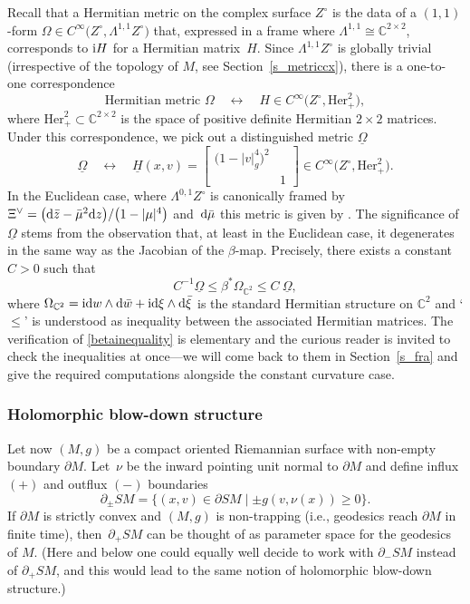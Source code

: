 \documentclass[pdftex]{sigma}
\numberwithin{equation}{section}
\theoremstyle{definition}
\newcommand{\C}{\mathbb{C}} %
\newcommand{\1}{{\bf 1}}
\newcommand{\Om}{{\underline{\Omega}}}
\begin{document}
Recall that a Hermitian metric on the complex surface $Z^\circ$ is the data of a $(1,1)$-form $\Omega\in C^\infty\bigl(Z^\circ,\Lambda^{1,1}Z^\circ\bigr)$ that, expressed in a frame where $\Lambda^{1,1}\cong \C^{2\times 2}$, corresponds to ${\rm i}H$ for a Hermitian matrix~$H$. Since $\Lambda^{1,1}Z^\circ$ is globally trivial (irrespective of the topology of $M$, see Section~\ref{s_metriccx}), there is a one-to-one correspondence
\[
	\text{Hermitian metric $\Omega$} \quad \leftrightarrow \quad H\in C^\infty\bigl(Z^\circ,\mathrm{Her}_+^2\bigr),
\]
where $\mathrm{Her}_+^2\subset \C^{2\times 2}$ is the space of positive definite Hermitian $2\times 2$ matrices.
 Under this correspondence, we pick out a distinguished metric $\Om$
\begin{equation}\label{def_om}
	\Om \quad \leftrightarrow \quad \underline{H}(x,v)=\begin{bmatrix}
 \bigl(1-|v|_g^4\bigr)^2 &\\
 & 1
\end{bmatrix} \in C^\infty\bigl(Z^\circ,\mathrm{Her}_+^2\bigr).
\end{equation}
In the Euclidean case, where $\Lambda^{0,1}Z^\circ$ is canonically framed by $ \Xi^\vee = \bigl({\rm d}\bar z - \bar \mu^2 {\rm d}z \bigr)/\bigl(1-|\mu|^4\bigr)$ and~${\rm d}\bar \mu$ this metric is given by
\smash{$ \Om ={\rm i} \bigl(1-|\mu|^4\bigr)^2 \bar \Xi^\vee\wedge \Xi^\vee + {\rm i} {\rm d}\mu \wedge {\rm d}\bar \mu$}.
The significance of $\Om$ stems from the observation that, at least in the Euclidean case, it degenerates in the same way as the Jacobian of the $\beta$-map. Precisely, there exists a constant $C>0$ such that
\begin{equation}\label{betainequality}
	C^{-1} \Om \le \beta^*\Omega_{\C^2} \le C~\Om,
\end{equation}
where $\Omega_{\C^2}={\rm i}{\rm d}w\wedge {\rm d}\bar w + {\rm i} {\rm d}\xi \wedge {\rm d}\bar \xi$ is the standard Hermitian structure on $\C^2$ and `$\le$' is understood as inequality between the associated Hermitian matrices. The verification of \eqref{betainequality} is elementary and the curious reader is invited to check the inequalities at once---we will come back to them in Section~\ref{s_fra} and give the required computations alongside the constant curvature case.

\subsubsection{Holomorphic blow-down structure}
Let now $(M,g)$ be a compact oriented Riemannian surface with non-empty boundary $\partial M$. Let~$\nu$ be the inward pointing unit normal to $\partial M$ and define
influx $(+)$ and outflux $(-)$ boundaries
\[
	\partial_\pm SM=\{(x,v)\in \partial SM\mid \pm g(v,\nu(x))\ge 0\}.
\]
If $\partial M$ is strictly convex and $(M,g)$ is non-trapping (i.e., geodesics reach $\partial M$ in finite time), then~$\partial_+SM$ can be thought of as
 parameter space for the geodesics of $M$. (Here and below one could equally well decide to work with $\partial_-SM$ instead of $\partial_+SM$, and this would lead to the same notion of holomorphic blow-down structure.)
\end{document}
